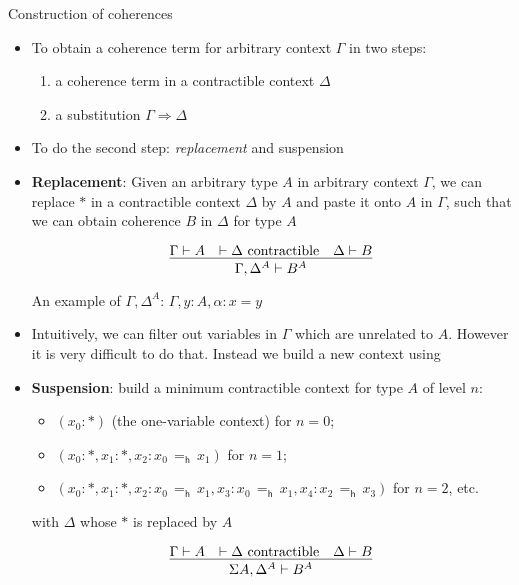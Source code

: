 \documentclass[12pt, mathserif,handout]{beamer}
\begin{document}
\begin{frame}[allowframebreaks,t]{Construction of coherences}

\begin{itemize}
\item To obtain a coherence term for arbitrary context $\Gamma$ in two steps:
\begin{enumerate}
\item a coherence term in a contractible context $\Delta$
\item a substitution $\Gamma \Rightarrow \Delta$
\end{enumerate}

\item To do the second step: \emph{replacement} and suspension

\item \textbf{Replacement}: Given an arbitrary type $A$ in arbitrary context
  $\Gamma$, we can replace $*$ in a contractible context $\Delta$ by
  $A$ and paste it onto $A$ in $\Gamma$, such that we can obtain coherence $B$ in $\Delta$ for type $A$

\begin{equation*}
\infer{\Gamma, \Delta^{A} \vdash B^{A}}
{\Gamma \vdash A & \vdash \Delta~ \text{contractible} & \Delta \vdash B} 
\end{equation*}

An example of $\Gamma, \Delta^{A}$: $\Gamma, y : A, \alpha : x = y$

\item Intuitively, we can filter out variables in $\Gamma$ which are
  unrelated to $A$. However it is very difficult to do that. Instead
  we build a new context using 

\item \textbf{Suspension}: build a minimum contractible context for type
  $A$ of level $n$:

\begin{itemize}
\item $(x_0: *)$ (the one-variable context) for $n=0$; 
\item $(x_0 : *, x_1 : *, x_2 : x_0\,=_\mathsf{h}\,x_1)$ for
$n=1$; 
\item $(x_0 : *, x_1 : *, x_2 : x_0\,=_\mathsf{h}\,x_1, x_3 :
x_0\,=_{\mathsf{h}}\,x_1, x_4 : x_2\,=_\mathsf{h}\,x_3)$ for $n=2$,
etc. 
\end{itemize}

with $\Delta$ whose $*$ is replaced by $A$

\begin{equation*}
\infer{\Sigma A, \Delta^{A} \vdash B^{A}}
{\Gamma \vdash A &  \vdash \Delta ~\text{contractible} & \Delta \vdash B} 
\end{equation*}



\end{itemize}
\end{frame}
\end{document}
